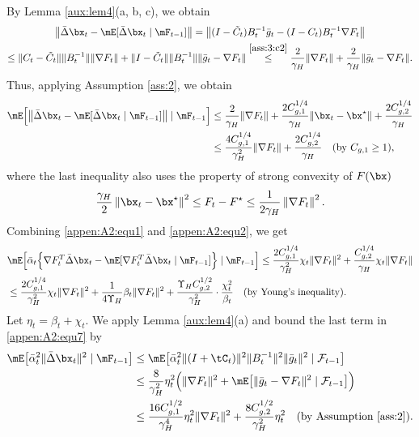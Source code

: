 By Lemma \ref{aux:lem4}(a, b, c), we obtain
\begin{multline*}
\big\|\bar{\Delta}\bx_t - \mE[\bar{\Delta}\bx_t\mid\mF_{t-1}]\big\| = \big\|(I-\tilde{C}_t)B_t^{-1}\bar{g}_t - (I-C_t)B_t^{-1}\nabla F_t\big\|\\
\leq \|C_t-\tilde{C}_t\|\|B_t^{-1}\|\|\nabla F_t\|+\|I-\tilde{C}_t\|\|B_t^{-1}\|\|\bar{g}_t-\nabla F_t\|\stackrel{\eqref{ass:3:c2}}{\leq} \frac{2}{\gamma_H}\|\nabla F_t\|+\frac{2}{\gamma_H}\|\bar{g}_t-\nabla F_t\|.
\end{multline*}
Thus, applying Assumption \ref{ass:2}, we obtain
\begin{align}\label{appen:A2:equ2}
\mE\Big[\big\|\bar{\Delta}\bx_t - \mE[\bar{\Delta}\bx_t\mid\mF_{t-1}]\big\|\mid\mF_{t-1}\Big] &\leq \frac{2}{\gamma_H}\|\nabla F_t\| + \frac{2C_{g,1}^{1/4}}{\gamma_H}\|\bx_t-\bx^\star\|+\frac{2C_{g,2}^{1/4}}{\gamma_H}\nonumber\\
&\leq \frac{4C_{g,1}^{1/4}}{\gamma_H^2}\|\nabla F_t\| +\frac{2C_{g,2}^{1/4}}{\gamma_H} \quad (\text{by } C_{g,1}\geq 1),
\end{align}
where the last inequality also uses the property of strong convexity of $F(\bx)$ \citep{Nesterov2018Lectures} 
\begin{equation}\label{appen:A2:equ3}
\frac{\gamma_H}{2}\left\|\bx_t-\bx^{\star}\right\|^2 \leq F_t-F^{\star} \leq \frac{1}{2 \gamma_H}\left\|\nabla F_t\right\|^2.
\end{equation}
Combining \eqref{appen:A2:equ1} and \eqref{appen:A2:equ2}, we get
\begin{align}\label{appen:A2:equ5}
&\mE\Big[\bar{\alpha}_t\Big\{\nabla F_t^T\bar{\Delta}\bx_t-\mE[\nabla F_t^T\bar{\Delta} \bx_t\mid\mF_{t-1}]\Big\}\mid\mF_{t-1}\Big] \leq \frac{2C_{g,1}^{1/4}}{\gamma_H^2}\chi_t\|\nabla F_t\|^2 + \frac{C_{g,2}^{1/4}}{\gamma_H}\chi_t\|\nabla F_t\|\nonumber\\
&\leq \frac{2C_{g,1}^{1/4}}{\gamma_H^2}\chi_t\|\nabla F_t\|^2 +\frac{1}{4\Upsilon_H}\beta_t\|\nabla F_t\|^2 + \frac{\Upsilon_H C_{g,2}^{1/2}}{\gamma_H^2}\cdot \frac{\chi_t^2}{\beta_t}\quad   \text{(by Young's inequality)}.
\end{align}
Let $\eta_t=\beta_t+\chi_t$. We apply Lemma \ref{aux:lem4}(a) and bound the last term in \eqref{appen:A2:equ7} by
 \begin{align}\label{appen:A2:equ6}
\mE\big[\bar{\alpha}_t^2\|\bar{\Delta} \bx_t\|^2\mid \mF_{t-1}\big]&\leq \mE\big[\bar{\alpha}_t^2\|(I+\tC_t)\|^2\|B_t^{-1}\|^2\|\bar{g}_t\|^2\mid \mathcal{F}_{t-1}\big]\nonumber\\
&\leq \frac{8}{\gamma_H^2}\eta_t^2\Big(\|\nabla F_t\|^2 + \mE\big[\|\bar{g}_t-\nabla F_t\|^2\mid \mathcal{F}_{t-1}\big]\Big)\nonumber\\ 
&\leq \frac{16C_{g,1}^{1/2}}{\gamma_H^4}\eta_t^2\|\nabla F_t\|^2 + \frac{8C_{g,2}^{1/2}}{\gamma_H^2}\eta_t^2\quad \text{(by Assumption \ref{ass:2})}.
\end{align}
